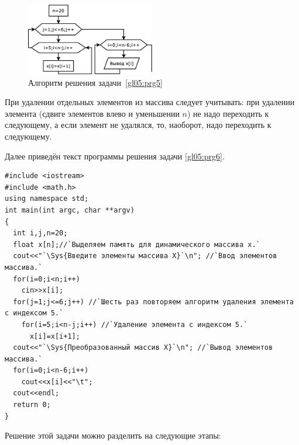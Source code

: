  
\begin{figure}[htb]
\begin{center}
\includegraphics[width=0.5\textwidth]{img/ris_5_11}
\caption{Алгоритм решения задачи~\ref{gl05:prg5}}
\label{ch05:refDrawing10}
\end{center}
\end{figure}


При удалении отдельных элементов из массива следует учитывать: при удалении элемента (сдвиге элементов влево и
уменьшении $n$) не надо переходить к следующему, а если элемент не удалялся, то, наоборот, надо переходить к следующему.

Далее приведён текст программы решения задачи \ref{gl05:prg6}.
\begin{lstlisting}
#include <iostream>
#include <math.h>
using namespace std;
int main(int argc, char **argv)
{
  int i,j,n=20;
  float x[n];//`Выделяем память для динамического массива x.`
  cout<<"`\Sys{Введите элементы массива X}`\n"; //`Ввод элементов массива.`
  for(i=0;i<n;i++)
    cin>>x[i];
  for(j=1;j<=6;j++) //`Шесть раз повторяем алгоритм удаления элемента с индексом 5.`
    for(i=5;i<n-j;i++) //`Удаление элемента с индексом 5.`
      x[i]=x[i+1];
  cout<<"`\Sys{Преобразованный массив X}`\n"; //`Вывод элементов массива.`
  for(i=0;i<n-6;i++)
    cout<<x[i]<<"\t";
  cout<<endl;
  return 0;
}
\end{lstlisting}



Решение этой задачи можно разделить на следующие этапы:

